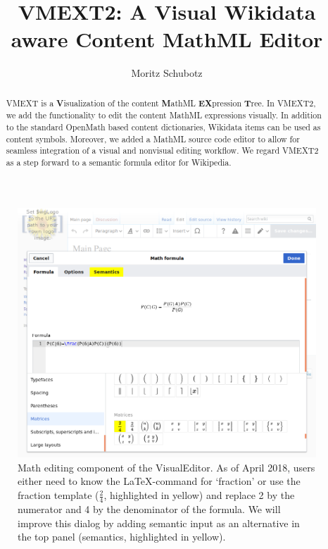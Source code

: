 \documentclass{llncs}
\begin{document}
\title{VMEXT2: A Visual Wikidata aware Content MathML Editor}
\author{Moritz Schubotz}
\maketitle

\begin{abstract}
VMEXT is a {\bf V}isualization of the content {\bf M}athML {\bf EX}pression {\bf T}ree.
In VMEXT2, we add the functionality to edit the content MathML expressions visually.
In addition to the standard OpenMath based content dictionaries, Wikidata items can be used as content symbols.
Moreover, we added a MathML source code editor to allow for seamless integration of a visual and nonvisual editing workflow.
We regard VMEXT2 as a step forward to a semantic formula editor for Wikipedia.
\end{abstract}

\begin{figure}[t]
\includegraphics[width=\textwidth]{images/overview.png}
\caption{Math editing component of the VisualEditor.
 As of April 2018, users either need to know the LaTeX-command for `fraction' or use the fraction template ($\frac{2}{4}$, highlighted in yellow) and replace 2 by the numerator and 4 by the denominator of the formula.
 We will improve this dialog by adding semantic input as an alternative in the top panel (semantics, highlighted in yellow).}\label{fig.overview}
\end{figure}
\end{document}
